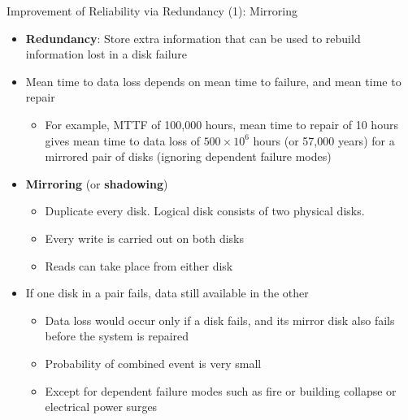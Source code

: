 \documentclass[aspectratio=169, xcolor=dvipsnames]{beamer}
\begin{document}
\begin{frame}{Improvement of Reliability via Redundancy (1): Mirroring}
    \begin{itemize}[<+->]
        \item \textbf{Redundancy}: Store extra information that can be used to rebuild information lost in a disk failure
        \item Mean time to data loss depends on mean time to failure, and mean time to repair
        \begin{itemize}
            \item[$\triangleright$] For example, MTTF of 100,000 hours, mean time to repair of 10 hours gives mean time to data loss of $500 \times 10^6$ hours (or 57,000 years) for a mirrored pair of disks (ignoring dependent failure modes)
        \end{itemize}
        \item \textbf{Mirroring} (or \textbf{shadowing})
        \begin{itemize}
            \item[$\triangleright$] Duplicate every disk. Logical disk consists of two physical disks.
            \item[$\triangleright$] Every write is carried out on both disks
            \item[$\triangleright$] Reads can take place from either disk
        \end{itemize}
        \item If one disk in a pair fails, data still available in the other
        \begin{itemize}
            \item[$\triangleright$] Data loss would occur only if a disk fails, and its mirror disk also fails before the system is repaired
            \item[$\triangleright$] Probability of combined event is very small
            \item[$\triangleright$] Except for dependent failure modes such as fire or building collapse or electrical power surges
        \end{itemize}
    \end{itemize}
\end{frame}
\end{document}
